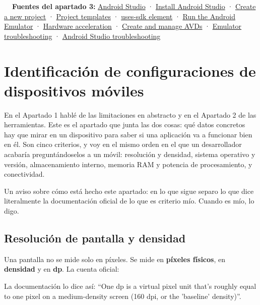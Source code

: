 \begin{fuentesbox}
\textbf{\color{muted}\faBook\ \ Fuentes del apartado 3:}
\href{https://developer.android.com/studio}{Android Studio} ·
\href{https://developer.android.com/studio/install}{Install Android Studio} ·
\href{https://developer.android.com/studio/projects/create-project}{Create a new project} ·
\href{https://developer.android.com/studio/projects/templates}{Project templates} ·
\href{https://developer.android.com/guide/topics/manifest/uses-sdk-element}{uses-sdk element} ·
\href{https://developer.android.com/studio/run/emulator}{Run the Android Emulator} ·
\href{https://developer.android.com/studio/run/emulator-acceleration}{Hardware acceleration} ·
\href{https://developer.android.com/studio/run/managing-avds}{Create and manage AVDs} ·
\href{https://developer.android.com/studio/run/emulator-troubleshooting}{Emulator troubleshooting} ·
\href{https://developer.android.com/studio/troubleshoot}{Android Studio troubleshooting}
\end{fuentesbox}

\newpage
\section{Identificación de configuraciones de dispositivos móviles}

En el Apartado 1 hablé de las limitaciones en abstracto y en el Apartado 2 de las herramientas. Este es el apartado que junta las dos cosas: qué datos concretos hay que mirar en un dispositivo para saber si una aplicación va a funcionar bien en él. Son cinco criterios, y voy en el mismo orden en el que un desarrollador acabaría preguntándoselos a un móvil: resolución y densidad, sistema operativo y versión, almacenamiento interno, memoria RAM y potencia de procesamiento, y conectividad.

Un aviso sobre cómo está hecho este apartado: en lo que sigue separo lo que dice literalmente la documentación oficial de lo que es criterio mío. Cuando es mío, lo digo.

\subsection{Resolución de pantalla y densidad}

Una pantalla no se mide solo en píxeles. Se mide en \textbf{píxeles físicos}, en \textbf{densidad} y en \textbf{dp}. La cuenta oficial:
\begin{center}\end{center}
La documentación lo dice así: \enquote{One dp is a virtual pixel unit that's roughly equal to one pixel on a medium-density screen (160 dpi, or the 'baseline' density)}.

